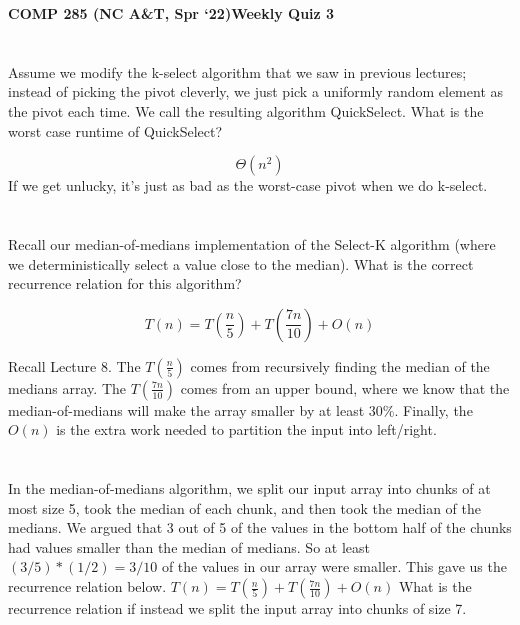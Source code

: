 \documentclass [12pt]{article}
\begin{document}
 

{\LARGE \textbf {COMP 285 (NC A\&T, Spr `22)}\hfill \textbf {Weekly Quiz 3} } 

\section{} Assume we modify the k-select algorithm that we saw in previous lectures; instead of picking the pivot cleverly, we just pick a uniformly random element as the pivot each time. We call the resulting algorithm QuickSelect. What is the worst case runtime of QuickSelect?

\begin{Solution}
$$\Theta(n^2)$$
If we get unlucky, it’s just as bad as the worst-case pivot when we do k-select.
\end{Solution}


\section{} Recall our median-of-medians implementation of the Select-K algorithm (where we deterministically select a value close to the median). What is the correct recurrence relation for this algorithm?

\begin{Solution}
$$T(n) = T\left(\frac{n}{5}\right) + T\left(\frac{7n}{10}\right) + O(n)$$

Recall Lecture 8. The $T\left(\frac{n}{5}\right)$ comes from recursively finding the median of the medians array. The $T\left(\frac{7n}{10}\right)$ comes from an upper bound, where we know that the median-of-medians will make the array smaller by at least $30\%$. Finally, the $O(n)$ is the extra work needed to partition the input into left/right.
\end{Solution}


\section{} In the median-of-medians algorithm, we split our input array into chunks of at most size 5, took the median of each chunk, and then took the median of the medians. We argued that 3 out of 5 of the values in the bottom half of the chunks had values smaller than the median of medians. So at least $(3/5)*(1/2) = 3/10$ of the values in our array were smaller. This gave us the recurrence relation below. $T(n) = T\left(\frac{n}{5}\right) + T\left(\frac{7n}{10}\right) + O(n)$
What is the recurrence relation if instead we split the input array into chunks of size 7.
\end{document}

